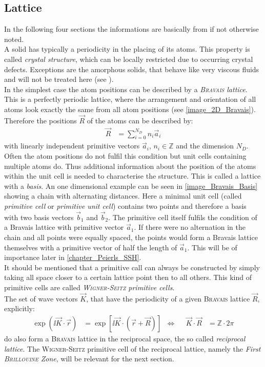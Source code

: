 \subsection{Lattice}
In the following four sections the informations are basically from \cite{ashcroft} if not otherwise noted.\\
A solid has typically a periodicity in the placing of its atoms. This property is called \emph{crystal structure}, which can be locally restricted due to occurring crystal defects. Exceptions are the amorphous solids, that behave like very viscous fluids and will not be treated here (see \cite{gerthsen}).\\
In the simplest case the atom positions can be described by a \emph{\textsc{Bravais} lattice}. This is a perfectly periodic lattice, where the arrangement and orientation of all atoms look exactly the same from all atom positions (see \cref{image_2D_Bravais}). Therefore the positions $\vec{R}$ of the atoms can be described by:
\begin{align}
	\vec{R} &= \sum_{i = 0}^{N_D} n_i \vec{a}_i
\end{align}
with linearly independent primitive vectors $\vec{a}_i$, $n_i \in \mathbb{Z}$ and the dimension $N_D$.\\ Often the atom positions do not fulfil this condition but unit cells containing multiple atoms do. Thus additional information about the position of the atoms within the unit cell is needed to characterise the structure. This is called a lattice with a \emph{ basis}. An one dimensional example can be seen in \cref{image_Bravais_Basis} showing a chain with alternating distances. Here a minimal unit cell (called \emph{primitive cell} or \emph{primitive unit cell}) contains two points and therefore a basis with two basis vectors $\vec{b}_1$ and $\vec{b}_2$. The primitive cell itself fulfils the condition of a Bravais lattice with primitive vector $\vec{a}_1$. If there were no alternation in the chain and all points were equally spaced, the points would form a Bravais lattice themselves with a primitive vector of half the length of $\vec{a}_1$. This will be of importance later in \cref{chapter_Peierls_SSH}.\\
It should be mentioned that a primitive call can always be constructed by simply taking all space closer to a certain lattice point then to all others. This kind of primitive cells are called \emph{\textsc{Wigner-Seitz} primitive cells}.\\
The set of wave vectors $\vec{K}$, that have the periodicity of a given \textsc{Bravais} lattice $\vec{R}$, explicitly:
\begin{align}
\exp\left(\ii\vec{K}\cdot\vec{r}\right) &= \exp\left[\ii\vec{K}\cdot\left(\vec{r} + \vec{R}\right)\right] &\Leftrightarrow& &\vec{K}\cdot\vec{R} &= \mathbb{Z}\cdot 2\pi	
\end{align}
do also form a \textsc{Bravais} lattice in the reciprocal space, the so called \emph{reciprocal lattice}. The \textsc{Wigner-Seitz} primitive cell of the reciprocal lattice, namely the \emph{First \textsc{Brillouine} Zone}, will be relevant for the next section.


